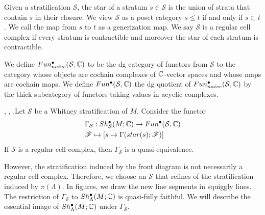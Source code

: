 \begin{definition}
Given a stratification $\mathcal{S}$, the star of a stratum $s\in \mathcal{S}$ is the union of strata that contain $s$ in their closure. We view $\mathcal{S}$ as a poset category $s\leq t$ if and only if $s \subset \overline{t}$. We call the map from $s$ to $t$ as a generization map. We say $\mathcal{S}$ is a regular cell complex if every stratum is contractible and moreover the star of each stratum is contractible.
\end{definition}

\begin{definition}
We define $Fun^\bullet_{naive}(\mathcal{S},\mathbb{C})$ to be the dg category of functors from $\mathcal{S}$ to the category whose objects are cochain complexes of $\mathbb{C}$-vector spaces and whose maps are cochain maps. 
We define $Fun^\bullet(\mathcal{S}, \mathbb{C})$ the dg quotient \cite{drinfeld2004dg} of $Fun^\bullet_{naive}(\mathcal{S},\mathbb{C})$ by the thick subcategory of functors taking values in acyclic complexes.
\end{definition}

\begin{proposition}\label{KS}
\cite{kashiwara1984riemann}, \cite{shepard1985cellular}, \cite[Lemma~2.3.2]{nadler2009microlocal}.Let $\mathcal{S}$ be a Whitney stratification of $M$. Consider the functor 
\begin{align*}
&\Gamma_\mathcal{S} : Sh^\bullet_\mathcal{S}(M;\mathbb{C}) \rightarrow Fun^\bullet(\mathcal{S},\mathbb{C})\\
&\mathscr{F} \mapsto [s\mapsto \Gamma(star(s);\mathscr{F})]
\end{align*}
If $\mathcal{S}$ is a regular cell complex, then $\Gamma_\mathcal{S}$ is a quasi-equivalence.
\end{proposition}
However, the stratification induced by the front diagram is not necessarily a regular cell complex. Therefore, we choose an $\mathcal{S}$ that refines of the stratification induced by $\pi(\Lambda)$. In figures, we draw the new line segments in squiggly lines. \\
The restriction of $\Gamma_\mathcal{S}$ to $Sh^\bullet_\Lambda(M;\mathbb{C})$ is quasi-fully faithful. We will describe the essential image of $Sh^\bullet_\Lambda(M;\mathbb{C})$ under $\Gamma_\mathcal{S}$.

